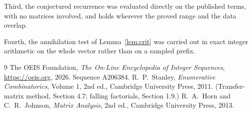 \documentclass[11pt,a4paper]{article}
\theoremstyle{plain}
\theoremstyle{definition}
\begin{document}
Third, the conjectured recurrence was evaluated directly on the published terms, with no
matrices involved, and holds wherever the proved range and the data overlap.

Fourth, the annihilation test of Lemma~\ref{lem:crit} was carried out in exact integer
arithmetic on the whole vector rather than on a sampled prefix.

\begin{thebibliography}{9}
 The OEIS Foundation, \emph{The On-Line Encyclopedia of Integer
Sequences}, \url{https://oeis.org}, 2026. Sequence A206384.
 R.~P.~Stanley, \emph{Enumerative Combinatorics}, Volume 1, 2nd ed.,
Cambridge University Press, 2011. (Transfer-matrix method, Section 4.7; falling factorials,
Section 1.9.)
 R.~A.~Horn and C.~R.~Johnson, \emph{Matrix Analysis}, 2nd ed., Cambridge
University Press, 2013.
\end{thebibliography}
\end{document}
